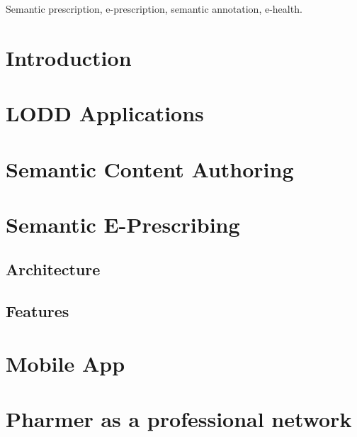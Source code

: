 \documentclass[journal]{IEEEtran}
\begin{document}
\begin{IEEEkeywords}
 Semantic prescription, e-prescription, semantic annotation, e-health.
\end{IEEEkeywords}



\IEEEpeerreviewmaketitle


\section{Introduction}
\label{intro}

\section{LODD Applications}
\label{lod}

\section{Semantic Content Authoring}
\label{sca}


\section{Semantic E-Prescribing}
\label{sep}

\subsection{Architecture}

\subsection{Features}

\section{Mobile App}
\label{mobile}

\section{Pharmer as a professional network}
\label{pharmernet}
\end{document}

